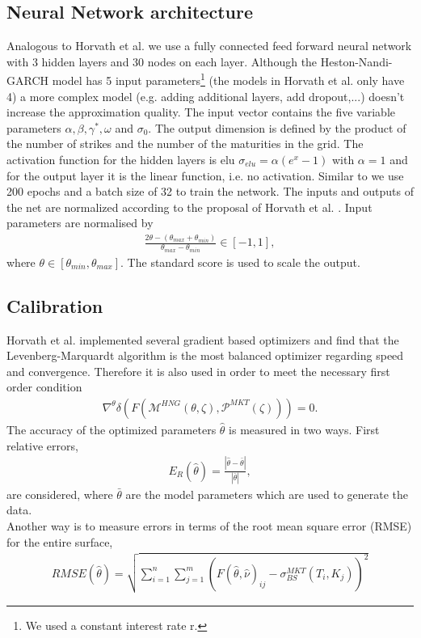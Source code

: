 \documentclass{article}
\begin{document}
\subsection{Neural Network architecture}\label{sec:NN_arch}
Analogous to Horvath et al. \cite{Blanka} we use a fully connected feed forward neural network with 3 hidden layers and 30 nodes on each layer. Although the Heston-Nandi-GARCH model has 5 input parameters\footnote{We used a constant interest rate r.} (the models in Horvath et al. \cite{Blanka} only have 4) a more complex model (e.g. adding additional layers, add dropout,...) doesn't increase the approximation quality. \newline
The input vector contains the five variable parameters $\alpha, \beta, \gamma^*, \omega$ and $\sigma_0$. The output dimension is defined by the product of the number of strikes and the number of the maturities in the grid. \newline
The activation function for the  hidden layers is elu $\sigma_{elu} = \alpha(e^x-1)$ with $\alpha = 1$ and for the output layer it is the linear function, i.e. no activation. \newline
Similar to \cite{Blanka} we use 200 epochs and a batch size of 32 to train the network. \newline
The inputs and outputs of the net are normalized according to the proposal of Horvath et al. \cite{Blanka}. Input parameters are normalised by 
\begin{align*}
    \frac{2\theta-(\theta_{max}+\theta_{min})}{\theta_{max}-\theta_{min}} \in [-1, 1],
\end{align*}
where $\theta \in [\theta_{min},\theta_{max}]$. The standard score is used to scale the output.   
\subsection{Calibration}
Horvath et al. \cite{Blanka} implemented several gradient based optimizers and find that the Levenberg-Marquardt algorithm is the most balanced optimizer regarding speed and convergence. Therefore it is also used in order to meet the necessary first order condition
\begin{align*}
    \nabla^{\theta}\delta(F(\mathcal{M}^{HNG}(\theta,\zeta), \mathcal{P}^{MKT}(\zeta))) = 0.
\end{align*}
The accuracy of the optimized parameters $\hat{\theta}$ is measured in two ways. First relative errors,
\begin{align*}
    E_R(\hat{\theta}) = \frac{|\hat{\theta}-\bar{\theta}|}{|\bar{\theta}|}, 
\end{align*}
are considered, where $\bar{\theta}$ are the model parameters which are used to generate the data. \\
Another way is to measure errors in terms of the root mean square error (RMSE) for the entire surface,
\begin{align*}
    RMSE(\hat{\theta}) = \sqrt{\sum_{i=1}^n\sum_{j=1}^m(F(\hat{\theta}, \hat{\nu})_{ij}-\sigma_{BS}^{MKT}(T_i,K_j))^2}
\end{align*}
\end{document}
